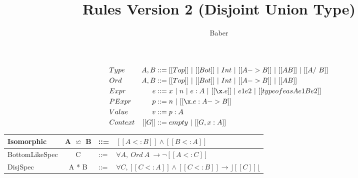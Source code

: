 \documentclass[a4paper]{article}
\title{Rules Version 2 (Disjoint Union Type)}
\author{Baber}
\begin{document}
\maketitle

\begin{align*}
&Type &A, B&::= [[Top]] ~ | ~[[Bot]]~|~ Int ~|~ [[A->B]]~ |~ [[A \/ B]] ~ |~ [[A /\ B]]\\
&Ord &A, B&::= [[Top]] ~ | ~[[Bot]]~|~ Int ~|~ [[A->B]]~ |~ [[A \/ B]]\\
&Expr &e &::= x ~|~ n ~|~ e:A ~|~[[\x.e]] ~ | ~ e1e2 ~|~ [[typeof e as A e1 B e2]]\\
&PExpr & p &::= n ~|~ [[\x.e : A->B]] \\
&Value &v &::= p : A \\
&Context & [[G]] &::= empty~ |~ [[G , x : A]]
\end{align*}






     {\renewcommand{\arraystretch}{1.5}
     \begin{center}
     \begin{tabular}{|lcll|}
       \hline
      Isomorphic & A $\backsimeq$ B & ::= & $[[A <: B]] \wedge [[B <: A]]$ \\
       \hline
      BottomLikeSpec & C & ::= & $\forall A, ~ Ord ~ A ~ \rightarrow \neg [[A <: C]]$ \\
       \hline
      DisjSpec & A * B & ::= & $\forall C, [[C <: A]] \wedge [[C <: B]] \rightarrow  \rfloor [[C]] \lfloor$ \\
       \hline
     \end{tabular}
     \end{center} }



\bigskip

\ottdefnsBottomLike

\ottdefnsDisjointness

\ottdefnsSubtyping

\ottdefnsTyping

\ottdefnsReduction
\end{document}

